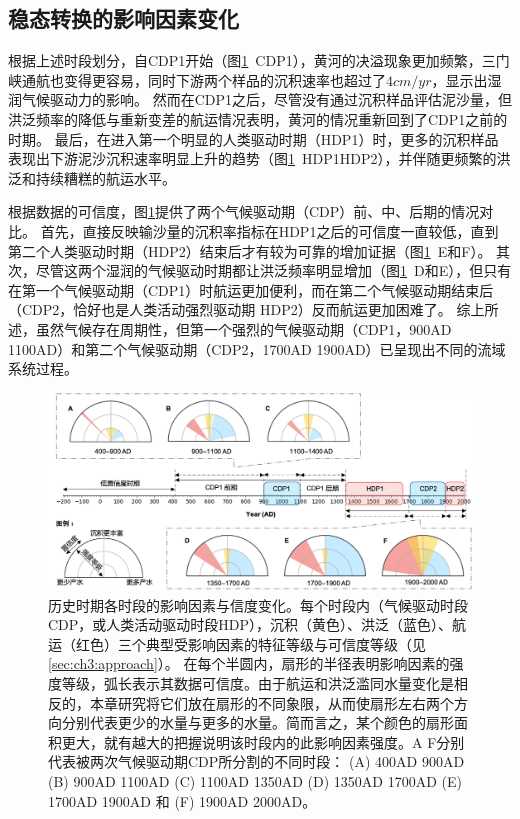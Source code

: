 \subsection{稳态转换的影响因素变化}

根据上述时段划分，自CDP1开始（图\ref{fig:ch3:impacts}~CDP1），黄河的决溢现象更加频繁，三门峡通航也变得更容易，同时下游两个样品的沉积速率也超过了$4cm/yr$，显示出湿润气候驱动力的影响。
然而在CDP1之后，尽管没有通过沉积样品评估泥沙量，但洪泛频率的降低与重新变差的航运情况表明，黄河的情况重新回到了CDP1之前的时期。
最后，在进入第一个明显的人类驱动时期（HDP1）时，更多的沉积样品表现出下游泥沙沉积速率明显上升的趋势（图\ref{fig:ch3:impacts}~HDP1\textendash{}HDP2），并伴随更频繁的洪泛和持续糟糕的航运水平。


根据数据的可信度，图\ref{fig:ch3:impacts}提供了两个气候驱动期（CDP）前、中、后期的情况对比。
首先，直接反映输沙量的沉积率指标在HDP1之后的可信度一直较低，直到第二个人类驱动时期（HDP2）结束后才有较为可靠的增加证据（图\ref{fig:ch3:impacts}~E和F）。
其次，尽管这两个湿润的气候驱动时期都让洪泛频率明显增加（图\ref{fig:ch3:impacts}~D和E），但只有在第一个气候驱动期（CDP1）时航运更加便利，而在第二个气候驱动期结束后（CDP2，恰好也是人类活动强烈驱动期 HDP2）反而航运更加困难了。
综上所述，虽然气候存在周期性，但第一个强烈的气候驱动期（CDP1，900AD \textendash{} 1100AD）和第二个气候驱动期（CDP2，1700AD \textendash{} 1900AD）已呈现出不同的流域系统过程。

\begin{figure}[!ht] %
    \includegraphics[width=\textwidth]{img/ch3/ch3_impacts.png}
    \caption[历史时期各时段的影响因素与信度变化]{历史时期各时段的影响因素与信度变化。每个时段内（气候驱动时段CDP，或人类活动驱动时段HDP），沉积（黄色）、洪泛（蓝色）、航运（红色）三个典型受影响因素的特征等级与可信度等级（见\ref{sec:ch3:approach}）。
    在每个半圆内，扇形的半径表明影响因素的强度等级，弧长表示其数据可信度。由于航运和洪泛滥同水量变化是相反的，本章研究将它们放在扇形的不同象限，从而使扇形左右两个方向分别代表更少的水量与更多的水量。简而言之，某个颜色的扇形面积更大，就有越大的把握说明该时段内的此影响因素强度。A \textendash{} F分别代表被两次气候驱动期CDP所分割的不同时段： (A) 400AD \textendash{} 900AD (B) 900AD \textendash{} 1100AD (C) 1100AD \textendash{} 1350AD (D) 1350AD \textendash{} 1700AD (E) 1700AD \textendash{} 1900AD 和 (F) 1900AD \textendash{} 2000AD。}\label{fig:ch3:impacts}
\end{figure}
